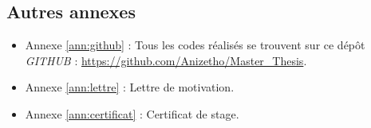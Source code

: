 \documentclass[oneside]{book}
\begin{document}
\begin{appendices}
\newpage



\newpage



\newpage





\newpage

\chapter{Autres annexes}
\begin{itemize}
\item Annexe \ref{ann:github} : Tous les codes réalisés se trouvent sur ce dépôt \textit{GITHUB} : \url{https://github.com/Anizetho/Master_Thesis}.
\item Annexe \ref{ann:lettre} : Lettre de motivation.
\item Annexe \ref{ann:certificat} : Certificat de stage.
\end{itemize}

\newpage


\end{appendices}
\end{document}

